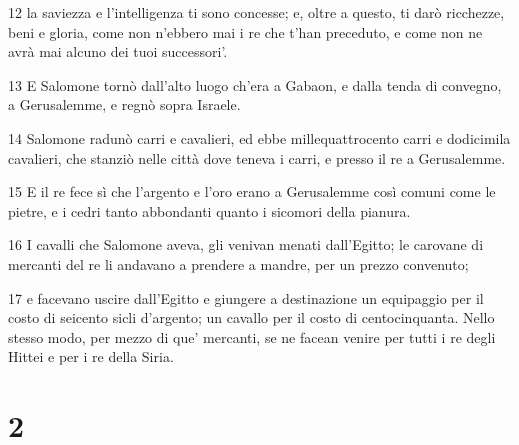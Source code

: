 \par 12 la saviezza e l'intelligenza ti sono concesse; e, oltre a questo, ti darò ricchezze, beni e gloria, come non n'ebbero mai i re che t'han preceduto, e come non ne avrà mai alcuno dei tuoi successori'.
\par 13 E Salomone tornò dall'alto luogo ch'era a Gabaon, e dalla tenda di convegno, a Gerusalemme, e regnò sopra Israele.
\par 14 Salomone radunò carri e cavalieri, ed ebbe millequattrocento carri e dodicimila cavalieri, che stanziò nelle città dove teneva i carri, e presso il re a Gerusalemme.
\par 15 E il re fece sì che l'argento e l'oro erano a Gerusalemme così comuni come le pietre, e i cedri tanto abbondanti quanto i sicomori della pianura.
\par 16 I cavalli che Salomone aveva, gli venivan menati dall'Egitto; le carovane di mercanti del re li andavano a prendere a mandre, per un prezzo convenuto;
\par 17 e facevano uscire dall'Egitto e giungere a destinazione un equipaggio per il costo di seicento sicli d'argento; un cavallo per il costo di centocinquanta. Nello stesso modo, per mezzo di que' mercanti, se ne facean venire per tutti i re degli Hittei e per i re della Siria.

\chapter{2}

